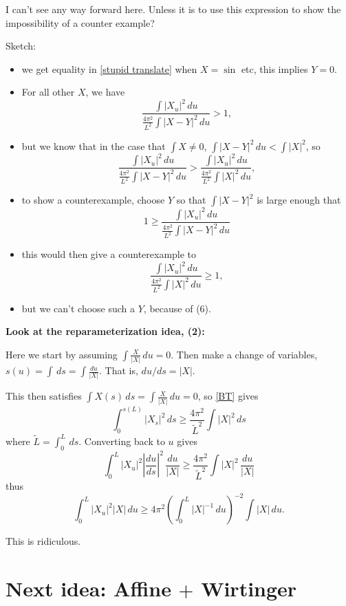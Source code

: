 \documentclass{amsart}
\begin{document}
I can't see any way forward here.   Unless it is to use this expression to show the impossibility of a counter example?

Sketch:   \begin{itemize}
\item we get equality in \eqref{stupid translate} when $X=\sin $ etc, this implies $Y=0$. 
\item For all other $X$, we have
\begin{equation}\frac{ \int |{X}_u|^2 \,du}{ \frac{4\pi^2}{L^2}\int |{X}-Y|^2\,du }> 1,  \end{equation}
\item but we know that in the case that $\int X\not=0$, $\int |{X}-Y|^2\,du < \int |X|^2$, so 
\begin{equation}
\frac{ \int |{X}_u|^2 \,du}{ \frac{4\pi^2}{L^2}\int |{X}-Y|^2\,du }> \frac{ \int |{X}_u|^2 \,du}{ \frac{4\pi^2}{L^2}\int |{X}|^2\,du },  \end{equation}
\item to show a counterexample, choose $Y$ so that $\int |X-Y|^2$ is large enough that 
\[1\ge \frac{ \int |{X}_u|^2 \,du}{ \frac{4\pi^2}{L^2}\int |{X}-Y|^2\,du }\]
\item this would then give a counterexample to 
\begin{equation}\frac{ \int |{X}_u|^2 \,du}{ \frac{4\pi^2}{L^2}\int |{X}|^2\,du }\ge 1, \label{stupid translate} \end{equation}
\item but we can't choose such a $Y$, because of (6).
\end{itemize}
\bigskip

\textbf{Look at the reparameterization idea, (2):}

Here we start by assuming  $\int \frac{X}{|X|}\,du=0$.  Then make a change of variables, $s(u)=\int \,ds=\int \frac{du}{|X|}$.   That is, $du/ds=|X|$.  

This then satisfies $\int X(s)\,ds=\int  \frac{X}{|X|}\,du=0$, so \eqref{BT} gives
\[ \int_0^{s(L)} |X_s|^2 \,ds \ge \frac{4\pi^2}{\tilde{L}^2}\int |X|^2\,ds\]
where $\tilde{L}=\int_0^L \,ds$.  Converting back to $u$ gives
\[ \int_0^{L} |X_u|^2|\frac{du}{ds}|^2 \,\frac{du}{|X|} \ge \frac{4\pi^2}{\tilde{L}^2}\int |X|^2\,\frac{du}{|X|}\]
thus
\[ \int_0^{L} |X_u|^2|X| \,du\ge {4\pi^2}\left(\int_0^L |X|^{-1}\,du \right)^{-2}\int |X|\,{du}.\]

This is ridiculous.

\clearpage

\section*{Next idea:  Affine $+$ Wirtinger}
\end{document}
